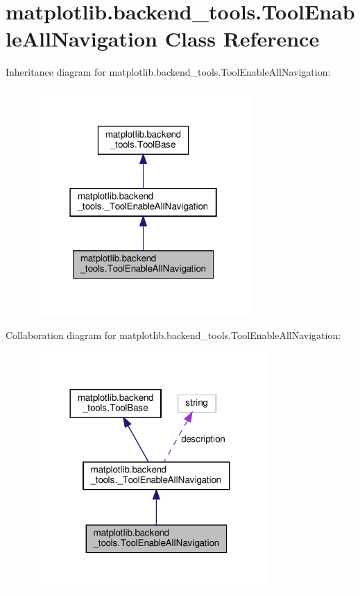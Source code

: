 \hypertarget{classmatplotlib_1_1backend__tools_1_1ToolEnableAllNavigation}{}\section{matplotlib.\+backend\+\_\+tools.\+Tool\+Enable\+All\+Navigation Class Reference}
\label{classmatplotlib_1_1backend__tools_1_1ToolEnableAllNavigation}


Inheritance diagram for matplotlib.\+backend\+\_\+tools.\+Tool\+Enable\+All\+Navigation\+:
\nopagebreak
\begin{figure}[H]
\begin{center}
\leavevmode
\includegraphics[width=238pt]{classmatplotlib_1_1backend__tools_1_1ToolEnableAllNavigation__inherit__graph}
\end{center}
\end{figure}


Collaboration diagram for matplotlib.\+backend\+\_\+tools.\+Tool\+Enable\+All\+Navigation\+:
\nopagebreak
\begin{figure}[H]
\begin{center}
\leavevmode
\includegraphics[width=252pt]{classmatplotlib_1_1backend__tools_1_1ToolEnableAllNavigation__coll__graph}
\end{center}
\end{figure}
